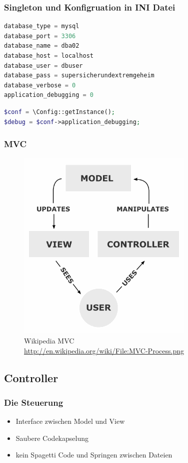 \documentclass[xcolor=dvipsnames]{beamer}
\begin{document}
\begin{frame}[fragile] %
\frametitle{Singleton und Konfigruation in INI Datei} %

\begin{lstlisting}[language=PHP, caption=config.ini]
database_type = mysql
database_port = 3306
database_name = dba02
database_host = localhost
database_user = dbuser
database_pass = supersicherundextremgeheim
database_verbose = 0
application_debugging = 0
\end{lstlisting} 

\begin{lstlisting}[language=PHP, caption=Config Klasse]
$conf = \Config::getInstance();
$debug = $conf->application_debugging;
\end{lstlisting} 

\end{frame}


\begin{frame} %
\frametitle{MVC} %
\begin{figure}
\includegraphics[scale=0.4]{MVC-Process.png}
\caption{Wikipedia MVC \\ \tiny{\textcolor{gray}{\url{http://en.wikipedia.org/wiki/File:MVC-Process.png}}}}
\end{figure}
\end{frame}


\subsection{Controller}
\begin{frame} %
  \frametitle{Die Steuerung} %
  \begin{block}{}
	  \begin{itemize}
  		\item Interface zwischen Model und View
  		\item Saubere Codekapselung
  		\item kein Spagetti Code und Springen zwischen Dateien
	  \end{itemize}
  \end{block} 
\end{frame}
\end{document}
